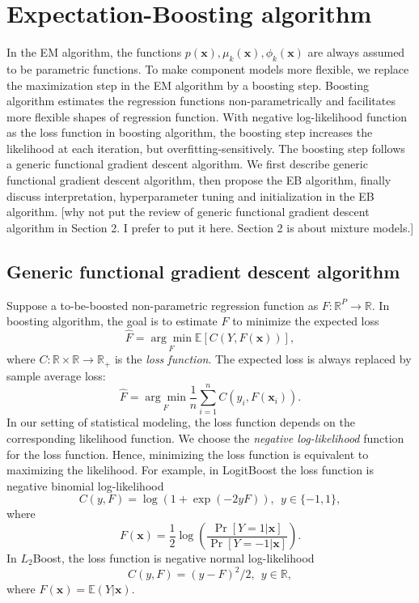 \documentclass[11pt]{article}
\numberwithin{equation}{section}
\def\R{{\mathbb R}}  %
\def\E{{\mathbb E}}  %
\def\bx{\boldsymbol{x}}
\begin{document}
\section{Expectation-Boosting algorithm}\label{sec:EB}
In the EM algorithm, the functions $p(\bx), \mu_k(\bx), \phi_k(\bx)$ are always assumed to be parametric functions.
To make component models more flexible, we replace the maximization step in the EM algorithm by a boosting step.
Boosting algorithm estimates the regression functions non-parametrically and facilitates more flexible shapes of regression function.
With negative log-likelihood function as the loss function in boosting algorithm, the boosting step increases the likelihood at each iteration, but overfitting-sensitively.
The boosting step follows a generic functional gradient descent algorithm.
We first describe generic functional gradient descent algorithm, then propose the EB algorithm, finally discuss interpretation, hyperparameter tuning and initialization in the EB algorithm. {\color{blue}[why not put the review of generic functional gradient descent algorithm in Section 2. I prefer to put it here. Section 2 is about mixture models.]}

\subsection{Generic functional gradient descent algorithm}

	Suppose a to-be-boosted {non-parametric regression function} as $F:\R^P\rightarrow\R$. In boosting algorithm, the goal is to  estimate $F$ to minimize the expected loss $$\hat{F}=\underset{F}{\arg\min}\E\left[C(Y,F(\bx))\right],$$
	where $C:\R\times\R\rightarrow\R_+$ is the \textit{loss function}.
	The expected loss is always replaced by sample average loss:
	$$\hat{F}=\underset{F}{\arg\min}\frac{1}{n}\sum_{i=1}^nC(y_i,F(\bx_i)).$$
	In our setting of statistical modeling, the loss function depends on the corresponding likelihood function.
	We choose the \textit{negative log-likelihood} function for the loss function. Hence, minimizing the loss function is equivalent to maximizing the likelihood.
For example, in LogitBoost the loss function is negative binomial log-likelihood
$$C(y,F)=\log(1+\exp(-2yF)), ~~ y\in\{-1,1\},$$
where 
\begin{equation}\label{logit-link}
F(\bx)=\frac{1}{2}\log\left(\frac{\Pr[Y=1|\bx]}{\Pr[Y=-1|\bx]}\right).
\end{equation}
In $L_2$Boost, the loss function is negative normal log-likelihood
\begin{equation}\label{l2}
	C(y,F)=(y-F)^2/2, ~~ y\in \R,
\end{equation}
where $F(\bx)=\E(Y|\bx).$
\end{document}
